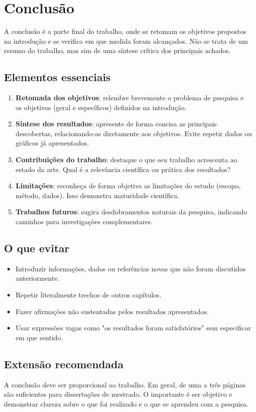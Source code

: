 \section{Conclusão}

A conclusão é a parte final do trabalho, onde se retomam os objetivos propostos na introdução e se verifica em que medida foram alcançados. Não se trata de um resumo do trabalho, mas sim de uma síntese crítica dos principais achados.

\subsection{Elementos essenciais}

\begin{enumerate}
    \item \textbf{Retomada dos objetivos}: relembre brevemente o problema de pesquisa e os objetivos (geral e específicos) definidos na introdução.

    \item \textbf{Síntese dos resultados}: apresente de forma concisa as principais descobertas, relacionando-as diretamente aos objetivos. Evite repetir dados ou gráficos já apresentados.

    \item \textbf{Contribuições do trabalho}: destaque o que seu trabalho acrescenta ao estado da arte. Qual é a relevância científica ou prática dos resultados?

    \item \textbf{Limitações}: reconheça de forma objetiva as limitações do estudo (escopo, método, dados). Isso demonstra maturidade científica.

    \item \textbf{Trabalhos futuros}: sugira desdobramentos naturais da pesquisa, indicando caminhos para investigações complementares.
\end{enumerate}

\subsection{O que evitar}

\begin{itemize}
    \item Introduzir informações, dados ou referências novas que não foram discutidos anteriormente.
    \item Repetir literalmente trechos de outros capítulos.
    \item Fazer afirmações não sustentadas pelos resultados apresentados.
    \item Usar expressões vagas como "os resultados foram satisfatórios" sem especificar em que sentido.
\end{itemize}

\subsection{Extensão recomendada}

A conclusão deve ser proporcional ao trabalho. Em geral, de uma a três páginas são suficientes para dissertações de mestrado. O importante é ser objetivo e demonstrar clareza sobre o que foi realizado e o que se aprendeu com a pesquisa.